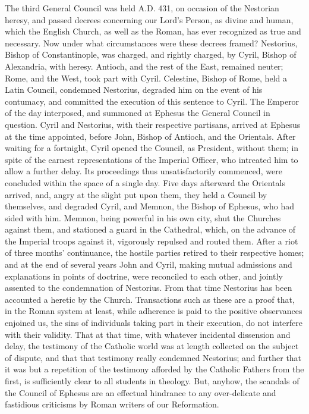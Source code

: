 The third General Council was held A.D. 431,
on occasion of the Nestorian heresy, and passed decrees concerning our
Lord's Person, as divine and human, which the English Church, as well
as the Roman, has ever recognized as true and necessary. Now under
what circumstances were these decrees framed? Nestorius, Bishop of
Constantinople, was charged, and rightly charged, by Cyril,
Bishop of Alexandria, with heresy. Antioch, and the rest of the East,
remained neuter; Rome, and the West, took part with Cyril. Celestine,
Bishop of Rome, held a Latin Council, condemned Nestorius, degraded
him on the event of his contumacy, and committed the execution of this
sentence to Cyril. The Emperor of the day interposed, and summoned at
Ephesus the General Council in question. Cyril and Nestorius, with
their respective partisans, arrived at Ephesus at the time appointed,
before John, Bishop of Antioch, and the Orientals. After waiting for a
fortnight, Cyril opened the Council, as President, without them; in
spite of the earnest representations of the Imperial Officer, who
intreated him to allow a further delay. Its proceedings thus
unsatisfactorily commenced, were concluded within the space of a
single day. Five days afterward the Orientals arrived, and, angry at
the slight put upon them, they held a Council by themselves, and
degraded Cyril, and Memnon, the Bishop of Ephesus, who had sided with
him. Memnon, being powerful in his own city, shut the Churches against
them, and stationed a guard in the Cathedral, which, on the advance of
the Imperial troops against it, vigorously repulsed and routed them.
After a riot of three months' continuance, the hostile parties retired
to their respective homes; and at the end of several years John and
Cyril, making mutual admissions and explanations in points of
doctrine, were reconciled to each other, and jointly assented to the
condemnation of Nestorius. From that time Nestorius has been accounted
a heretic by the Church. Transactions such as these are a proof that,
in the Roman system at least, while adherence is paid to the positive
observances enjoined us, the sins of individuals taking part in their
execution, do not interfere with their validity. That at that time,
with whatever incidental dissension and delay, the testimony of
the Catholic world was at length collected on the subject of dispute,
and that that testimony really condemned Nestorius; and further that
it was but a repetition of the testimony afforded by the Catholic
Fathers from the first, is sufficiently clear to all students in
theology. But, anyhow, the scandals of the Council of Ephesus are an
effectual hindrance to any over-delicate and fastidious criticisms by
Roman writers of our Reformation.

